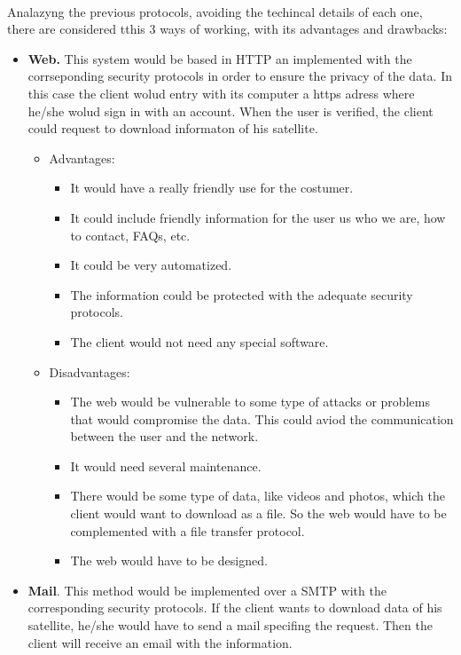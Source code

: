 \paragraph{}Analazyng the previous protocols, avoiding the techincal details of each one, there are considered tthis 3 ways of working, with its advantages and drawbacks:
\begin{itemize}
\item \textbf{Web.} This system would be based in HTTP an implemented with the corrseponding security protocols in order to ensure the privacy of the data. In this case the client wolud entry with its computer a https adress where he/she wolud sign in with an account. When the user is verified, the client could request to download informaton of his satellite. 
\begin{itemize}
\item Advantages: 
\begin{itemize}
\item It would have a really friendly use for the costumer.
\item It could include friendly information for the user us who we are, how to contact, FAQs, etc.
\item It could be very automatized.
\item The information could be protected with the adequate security protocols.
\item The client would not need any special software.
\end{itemize}
\item Disadvantages:
\begin{itemize}
\item The web would be vulnerable to some type of attacks or problems that would compromise the data. This could aviod the communication between the user and the network.
\item It would need several maintenance.
\item There would be some type of data, like videos and photos, which the client would want to download as a file. So the web would have to be complemented with a file transfer protocol.
\item The web would have to be designed.
\end{itemize}
\end{itemize}
\item \textbf{Mail}. This method would be implemented over a SMTP with the corresponding security protocols. If the client wants to download data of his satellite, he/she would have to send a mail specifing the request. Then the client will receive an email with the information.

\end{itemize}
